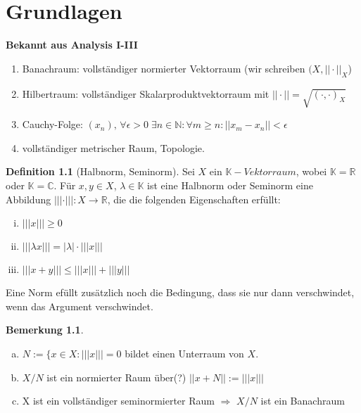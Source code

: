 \documentclass[ngerman]{report}
\theoremstyle{definition}%
\newtheorem{definition}[section]{Definition}
\newtheorem{bem}[section]{Bemerkung}
\newcommand{\C}{\mathbb{C}}
\newcommand{\R}{\mathbb{R}}
\newcommand{\N}{\mathbb{N}}
\newcommand{\K}{\mathbb{K}}
\begin{document}
\chapter{Grundlagen}
\textbf{Bekannt aus Analysis I-III}
\begin{enumerate}[-]
\item 
Banachraum: vollständiger normierter Vektorraum (wir schreiben $(X, ||\cdot ||_X$)

\item 
Hilbertraum: vollständiger Skalarproduktvektorraum mit $||\cdot || = \sqrt{(\cdot , \cdot )_X}$
\item
Cauchy-Folge: $(x_n),\,  \forall \epsilon > 0\; \exists n \in \N : \forall m \geq n : ||x_m-x_n||<\epsilon$
\item 
vollständiger metrischer Raum, Topologie.
\end{enumerate}

\begin{definition}[Halbnorm, Seminorm]
Sei $X$ ein $\K-Vektorraum$, wobei $\K = \R$ oder $\K = \C$. 
Für $x,y\in X$, $\lambda \in \K$ ist eine Halbnorm oder Seminorm eine Abbildung
$|||\cdot |||:X \rightarrow \R$, die die folgenden Eigenschaften erfüllt:
\begin{enumerate}[(i)]
\item $|||x|||\geq 0$
\item $|||\lambda x||| = |\lambda|\cdot |||x|||$
\item $|||x+y||| \leq |||x||| + |||y|||$
\end{enumerate}
\end{definition}

Eine Norm efüllt zusätzlich noch die Bedingung, dass sie nur dann verschwindet, wenn das Argument verschwindet.

\begin{bem}
\begin{enumerate}[(a)]
\item 
$N:=\{x\in X: |||x|||=0$ bildet einen Unterraum von $X$.
\item 
$X/N$ ist ein normierter Raum über(?) $||x+N|| := |||x|||$
\item 
X ist ein vollständiger seminormierter Raum $\Rightarrow$ $X/N$ ist ein Banachraum 
\end{enumerate}
\end{bem}
\end{document}
